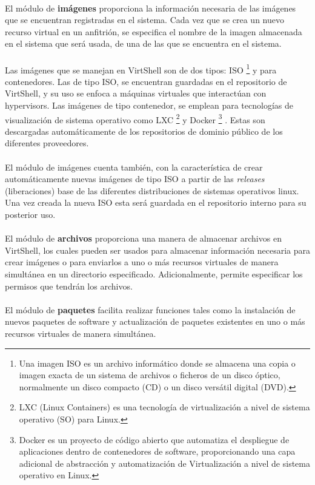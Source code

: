 \documentclass[conference, spanish]{IEEEtran}
\begin{document}
\\
El módulo de \textbf{imágenes} proporciona la información necesaria de las imágenes que se encuentran registradas en el sistema. Cada vez que se crea un nuevo recurso virtual en un anfitrión, se especifica el nombre de la imagen almacenada en el sistema que será usada, de una de las que se encuentra en el sistema. \\
\\
Las imágenes que se manejan en VirtShell son de dos tipos: ISO \footnote{Una imagen ISO es un archivo informático donde se almacena una copia o imagen exacta de un sistema de archivos o ficheros de un disco óptico, normalmente un disco compacto (CD) o un disco versátil digital (DVD).} y para contenedores. Las de tipo ISO, se encuentran guardadas en el repositorio de VirtShell, y su uso se enfoca a máquinas virtuales que interactúan con hypervisors. Las imágenes de tipo contenedor, se emplean para tecnologías de visualización de sistema operativo como LXC \footnote{LXC (Linux Containers) es una tecnología de virtualización a nivel de sistema operativo (SO) para Linux. } \cite{lxc16} y Docker \footnote{Docker es un proyecto de código abierto que automatiza el despliegue de aplicaciones dentro de contenedores de software, proporcionando una capa adicional de abstracción y automatización de Virtualización a nivel de sistema operativo en Linux.} \cite{docker16}. Estas son descargadas automáticamente de los repositorios de dominio público de los diferentes proveedores. \\
\\
El módulo de imágenes cuenta también, con la característica de crear automáticamente nuevas imágenes de tipo ISO a partir de las \emph{releases} (liberaciones) base de las diferentes distribuciones de sistemas operativos linux. Una vez creada la nueva ISO esta será guardada en el repositorio interno para su posterior uso.\\
\\
El módulo de \textbf{archivos} proporciona una manera de almacenar archivos en VirtShell, los cuales pueden ser usados para almacenar información necesaria para crear imágenes o para enviarlos a uno o más recursos virtuales de manera simultánea en un directorio especificado. Adicionalmente, permite especificar los permisos que tendrán los archivos.\\
\\
El módulo de \textbf{paquetes} facilita realizar funciones tales como la instalación de nuevos paquetes de software y actualización de paquetes existentes en uno o más recursos virtuales de manera simultánea.
\end{document}
